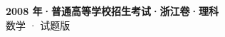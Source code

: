 \documentclass[zihao=-4, a4paper]{ctexart}
\begin{document}
\begin{center}
  {\Large\bfseries 2008 年·普通高等学校招生考试·浙江卷·理科}\\[4pt]
  {\large 数学 · 试题版}
\end{center}
\medskip
{}

\end{document}
